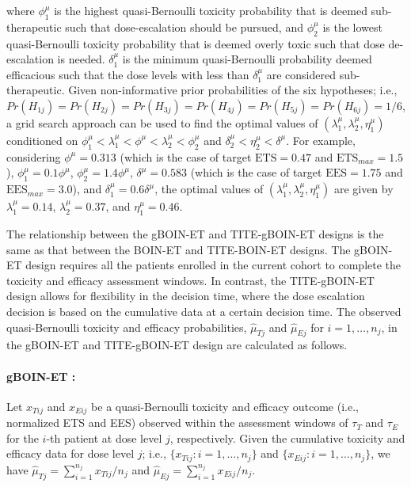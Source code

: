 where $\phi^{\mu}_1$ is the highest quasi-Bernoulli toxicity probability that is deemed sub-therapeutic such that dose-escalation should be pursued, and $\phi^{\mu}_2$ is the lowest quasi-Bernoulli toxicity probability that is deemed overly toxic such that dose de-escalation is needed. $\delta^{\mu}_1$ is the minimum quasi-Bernoulli probability deemed efficacious such that the dose levels with less than $\delta^{\mu}_1$ are considered sub-therapeutic. Given non-informative prior probabilities of the six hypotheses; i.e., $Pr(H_{1j})=Pr(H_{2j})=Pr(H_{3j})=Pr(H_{4j})=Pr(H_{5j})=Pr(H_{6j})=1/6$, a grid search approach can be used to find the optimal values of $(\lambda^{\mu}_1,\lambda^{\mu}_2,\eta^{\mu}_1)$ conditioned on $\phi^{\mu}_1<\lambda^{\mu}_1<\phi^{\mu}<\lambda^{\mu}_2<\phi^{\mu}_2$ and $\delta^{\mu}_2<\eta^{\mu}_2<\delta^{\mu}$. For example, considering $\phi^{\mu}=0.313$ (which is the case of target $\text{ETS}=0.47$ and $\text{ETS}_{max}=1.5$), $\phi^{\mu}_1=0.1\phi^{\mu}$, $\phi^{\mu}_2=1.4\phi^{\mu}$, $\delta^{\mu}=0.583$ (which is the case of target $\text{EES}=1.75$ and $\text{EES}_{max}=3.0$), and $\delta^{\mu}_1=0.6\delta^{\mu}$, the optimal values of $(\lambda^{\mu}_1,\lambda^{\mu}_2,\eta^{\mu}_1)$ are given by $\lambda^{\mu}_1=0.14$, $\lambda^{\mu}_2=0.37$, and $\eta^{\mu}_1=0.46$.

The relationship between the gBOIN-ET and TITE-gBOIN-ET designs is the same as that between the BOIN-ET and TITE-BOIN-ET designs. The gBOIN-ET design requires all the patients enrolled in the current cohort to complete the toxicity and efficacy assessment windows. In contrast, the TITE-gBOIN-ET design allows for flexibility in the decision time, where the dose escalation decision is based on the cumulative data at a certain decision time. The observed quasi-Bernoulli toxicity and efficacy probabilities, $\hat{\mu}_{Tj}$ and $\hat{\mu}_{Ej}$ for $i=1,\ldots,n_j$, in the gBOIN-ET and TITE-gBOIN-ET design are calculated as follows.

\paragraph{gBOIN-ET \citep{takeda:2022b}:} Let $x_{Tij}$ and $x_{Eij}$ be a quasi-Bernoulli toxicity and efficacy outcome (i.e., normalized ETS and EES) observed within the assessment windows of $\tau_T$ and $\tau_E$ for the $i$-th patient at dose level $j$, respectively. Given the cumulative toxicity and efficacy data for dose level $j$; i.e., $\{x_{Tij}:i=1,\ldots,n_j\}$ and $\{x_{Eij}:i=1,\ldots,n_j\}$, we have $\hat{\mu}_{Tj}=\sum_{i=1}^{n_j}x_{Tij}/n_j$ and $\hat{\mu}_{Ej}=\sum_{i=1}^{n_j}x_{Eij}/n_j$.

